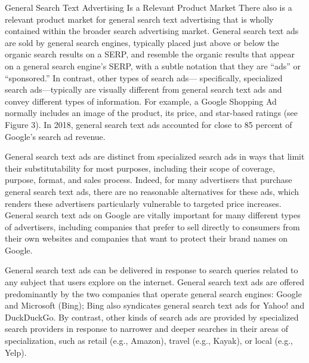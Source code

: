 \documentclass[11pt,b5paper]{scrartcl}
\begin{document}

General Search Text Advertising Is a Relevant Product Market
There also is a relevant product market for general search text advertising that is
wholly contained within the broader search advertising market. General search text ads are sold
by general search engines, typically placed just above or below the organic search results on a
SERP, and resemble the organic results that appear on a general search engine’s SERP, with a
subtle notation that they are “ads” or “sponsored.” In contrast, other types of search ads—
specifically, specialized search ads—typically are visually different from general search text ads
and convey different types of information. For example, a Google Shopping Ad normally
includes an image of the product, its price, and star-based ratings (see Figure 3). In 2018, general
search text ads accounted for close to 85 percent of Google’s search ad revenue.


General search text ads are distinct from specialized search ads in ways that limit
their substitutability for most purposes, including their scope of coverage, purpose, format, and
sales process. Indeed, for many advertisers that purchase general search text ads, there are no
reasonable alternatives for these ads, which renders these advertisers particularly vulnerable to
targeted price increases. General search text ads on Google are vitally important for many
different types of advertisers, including companies that prefer to sell directly to consumers from
their own websites and companies that want to protect their brand names on Google.


General search text ads can be delivered in response to search queries related to
any subject that users explore on the internet. General search text ads are offered predominantly
by the two companies that operate general search engines: Google and Microsoft (Bing); Bing
also syndicates general search text ads for Yahoo! and DuckDuckGo. By contrast, other kinds of
search ads are provided by specialized search providers in response to narrower and deeper
searches in their areas of specialization, such as retail (e.g., Amazon), travel (e.g., Kayak), or
local (e.g., Yelp).

\end{document}
